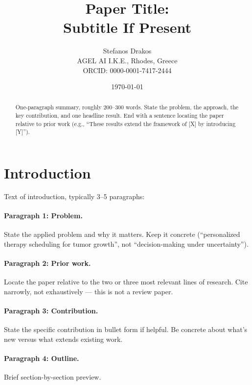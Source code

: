 \documentclass[11pt,a4paper]{article}
\title{\textbf{Paper Title:\\
  Subtitle If Present}}
\author{Stefanos Drakos\\
\small{AGEL AI I.K.E., Rhodes, Greece}\\
\small{ORCID: 0000-0001-7417-2444}}
\date{\today}
\theoremstyle{plain}
\theoremstyle{definition}
\begin{document}
\maketitle


\begin{abstract}
One-paragraph summary, roughly 200--300 words. State the problem, the
approach, the key contribution, and one headline result. End with a
sentence locating the paper relative to prior work (e.g., ``These
results extend the framework of [X] by introducing [Y]'').
\end{abstract}


\section{Introduction}
\label{sec:intro}

Text of introduction, typically 3--5 paragraphs:

\paragraph{Paragraph 1: Problem.} State the applied problem and
why it matters. Keep it concrete (``personalized therapy scheduling
for tumor growth'', not ``decision-making under uncertainty'').

\paragraph{Paragraph 2: Prior work.} Locate the paper relative to
the two or three most relevant lines of research. Cite narrowly,
not exhaustively --- this is not a review paper.

\paragraph{Paragraph 3: Contribution.} State the specific
contribution in bullet form if helpful. Be concrete about what's
new versus what extends existing work.

\paragraph{Paragraph 4: Outline.} Brief section-by-section preview.
\end{document}
